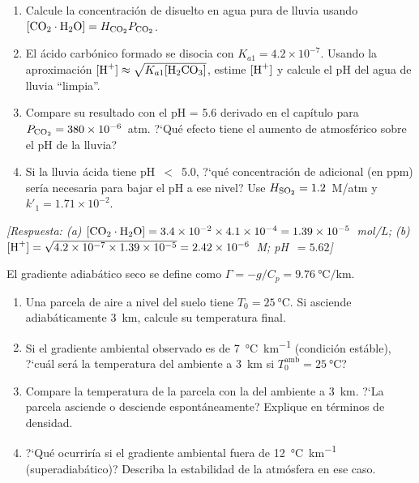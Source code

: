 \begin{bloque_ejercicios}
\begin{ejercicios}
\begin{enumerate}[label=\alph*)]
    \item Calcule la concentraci\'on de  disuelto en agua pura
          de lluvia usando $[\ce{CO2}\cdot\ce{H2O}] = H_{\ce{CO2}}P_{\ce{CO2}}$.
    \item El \'acido carb\'onico formado se disocia con
          $K_{a1} = 4.2\times10^{-7}$. Usando la aproximaci\'on
          $[\ce{H+}] \approx \sqrt{K_{a1}[\ce{H2CO3}]}$,
          estime $[\ce{H+}]$ y calcule el pH del agua de lluvia
          ``limpia''.
    \item Compare su resultado con el pH = 5.6 derivado en el
          cap\'itulo para $P_{\ce{CO2}} = 380\times10^{-6}$~atm.
          ?`Qu\'e efecto tiene el aumento de  atmosf\'erico
          sobre el pH de la lluvia?
    \item Si la lluvia \'acida tiene pH~$<$~5.0, ?`qu\'e
          concentraci\'on de  adicional (en ppm) ser\'ia
          necesaria para bajar el pH a ese nivel?
          Use $H_{\ce{SO2}} = 1.2$~M/atm y $k'_1 = 1.71\times10^{-2}$.
\end{enumerate}

\textit{[Respuesta:
(a) $[\ce{CO2}\cdot\ce{H2O}] = 3.4\times10^{-2}
    \times 4.1\times10^{-4} = 1.39\times10^{-5}$~mol/L;
(b) $[\ce{H+}] = \sqrt{4.2\times10^{-7}\times1.39\times10^{-5}}
    = 2.42\times10^{-6}$~M; pH~$= 5.62$]}

\item El gradiente adiab\'atico seco se define como
$\Gamma = -g/C_p = \SI{9.76}{\celsius\per\kilo\metre}$.

\begin{enumerate}[label=\alph*)]
    \item Una parcela de aire a nivel del suelo tiene
          $T_0 = \SI{25}{\celsius}$. Si asciende adiab\'aticamente
          \SI{3}{\kilo\metre}, calcule su temperatura final.
    \item Si el gradiente ambiental observado es de
          \SI{7}{\celsius\per\kilo\metre} (condici\'on est\'able),
          ?`cu\'al ser\'a la temperatura del ambiente a \SI{3}{\kilo\metre}
          si $T_0^{\text{amb}} = \SI{25}{\celsius}$?
    \item Compare la temperatura de la parcela con la del ambiente
          a \SI{3}{\kilo\metre}. ?`La parcela asciende o desciende
          espont\'aneamente? Explique en t\'erminos de densidad.
    \item ?`Qu\'e ocurrir\'ia si el gradiente ambiental fuera de
          \SI{12}{\celsius\per\kilo\metre} (superadiab\'atico)?
          Describa la estabilidad de la atm\'osfera en ese caso.
\end{enumerate}


\end{ejercicios}
\end{bloque_ejercicios}
